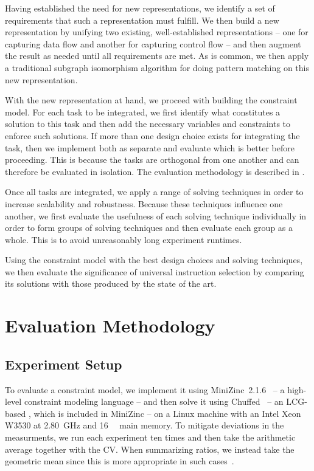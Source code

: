 Having established the need for new representations, we identify a set of
requirements that such a representation must fulfill.
%
We then build a new representation by unifying two existing, well-established
representations -- one for capturing data flow and another for capturing control
flow -- and then augment the result as needed until all requirements are met.
%
As is common, we then apply a traditional \gls{subgraph isomorphism} algorithm
for doing \gls{pattern matching} on this new representation.

With the new representation at hand, we proceed with building the
\gls{constraint model}.
%
For each task to be integrated, we first identify what constitutes a
\gls{solution} to this task and then add the necessary \glspl{variable} and
\glspl{constraint} to enforce such \glspl{solution}.
%
If more than one design choice exists for integrating the task, then we
implement both as separate  and evaluate which is
better before proceeding.
%
This is because the tasks are orthogonal from one another and can therefore be
evaluated in isolation.
%
The evaluation methodology is described in
.

Once all tasks are integrated, we apply a range of solving techniques in order
to increase scalability and robustness.
%
Because these techniques influence one another, we first evaluate the usefulness
of each solving technique individually in order to form groups of solving
techniques and then evaluate each group as a whole.
%
This is to avoid unreasonably long experiment runtimes.

Using the \gls{constraint model} with the best design choices and solving
techniques, we then evaluate the significance of \gls{universal instruction
  selection} by comparing its \glspl{solution} with those produced by the state
of the art.


\section{Evaluation Methodology}

\subsection{Experiment Setup}

To evaluate a \gls{constraint model}, we implement it using \mbox{\gls{MiniZinc}
  2.1.6}~\cite{NethercoteEtAl:2007} -- a high-level \gls{constraint} modeling
language -- and then solve it using \gls{Chuffed}~\cite{Chu:2011} -- an
\gls{LCG}-based , which is included in
\gls{MiniZinc} -- on a Linux machine with an \gls{Intel} Xeon W3530 at
\SI{2.80}{\GHz} and \SI{16}{\giga\byte} main memory.
%
To mitigate deviations in the measurments, we run each experiment ten times and
then take the arithmetic average together with the \gls{CV}.
%
When summarizing ratios, we instead take the geometric mean since this is more
appropriate in such cases~\cite{FlemingWallace:1986}.

